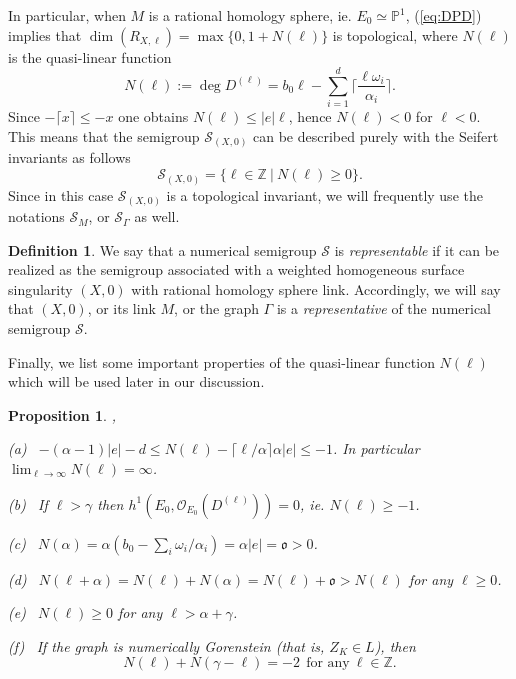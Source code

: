 \documentclass[oneside]{amsart}
\numberwithin{equation}{section}
\numberwithin{equation}{subsection}
\theoremstyle{plain}
\newtheorem{prop}[equation]{Proposition}
\theoremstyle{definition}
\newtheorem{definition}[equation]{Definition}
\newcommand{\calS}{{\mathcal S}}\newcommand{\cals}{{\bf s}}\newcommand{\calst}{{\bf st}}\newcommand{\cS}{{\mathcal S}}
\newcommand{\Se}{\mathcal{S}}
\newcommand{\G}{\Gamma}
\begin{document}
In particular, when $M$ is a rational homology sphere, ie. $E_0\simeq \mathbb{P}^1$, (\ref{eq:DPD}) implies that $\dim(R_{X,\ell})=\max\{0,1+N(\ell)\}$ is topological, where $N(\ell)$
is  the quasi-linear function 
\begin{equation}\label{defN}
N(\ell):=\deg D^{(\ell)}=b_0\ell-\sum_{i=1}^d\Big\lceil \frac{\ell \omega_i}{\alpha_i}\Big\rceil.
\end{equation}
Since $-\lceil x\rceil \leq -x$ one obtains $N(\ell)\leq |e|\ell$,
hence  $N(\ell)<0$ for $\ell<0$.
This means that the semigroup $\calS_{(X,0)}$ can be described purely with the Seifert invariants  as follows
\begin{equation}\label{eq:sgptop}
\mathcal{S}_{(X,0)}=\{\ell\in\mathbb{Z} \ | \ N(\ell)\geq 0\}.
\end{equation}
Since in this case $\calS_{(X,0)}$ is a topological invariant, we will frequently use the notations $\calS_{M}$, or $\calS_{\Gamma}$ as well. 

\begin{definition}
 We say that a numerical semigroup $\Se$ is {\it representable} if it can be realized as the semigroup associated with a weighted homogeneous
    surface singularity $(X,0)$ with rational homology sphere link. 
 Accordingly, we will say that $(X,0)$, or its link $M$, or the graph $\G$
 is a {\it representative} of the numerical semigroup $\Se$.
\end{definition}

Finally, we list some important properties of the quasi-linear function $N(\ell)$ which will be used later in our discussion.

\begin{prop}{\cite{art_nem_emb}, \cite[Prop. 3.2.11 \& 3.2.13]{stronglyflat}}\label{prop:INEQ} \

(a) \ $-(\alpha-1)|e|-d\leq N(\ell)-\lceil \ell/\alpha\rceil \alpha |e| \leq -1$. In particular
$\lim_{\ell\to\infty}N(\ell)=\infty$.

(b) \ If $\ell>\gamma$ then $h^1(E_0,\mathcal{O}_{E_0}(D^{(\ell)}))=0$, ie. $N(\ell)\geq -1$.


(c) \ $N(\alpha)=\alpha(b_0-\sum_i\omega_i/\alpha_i)=\alpha |e|=\mathfrak{o}>0$.

(d) \ $N(\ell+\alpha)=N(\ell)+N(\alpha)=N(\ell)+\mathfrak{o}>N(\ell)$ for any $ \ell\geq 0$.

(e) \ $N(\ell)\geq 0$ for any $\ell>\alpha+\gamma$.

(f) \ If the graph is numerically Gorenstein  (that is, $Z_K\in L$), then
\begin{equation}\label{SHSsym}
N(\ell)+N(\gamma-\ell)=-2 \ \ \mbox{for any} \ \ell\in\mathbb{Z}.
\end{equation}
\end{prop}
\end{document}

